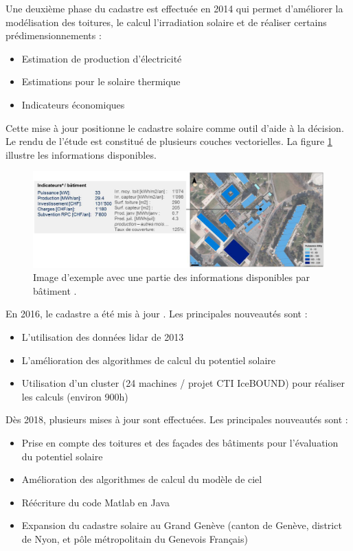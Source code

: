 \par{Une deuxième phase du cadastre est effectuée en 2014 \cite{desthieux_etude_2014} qui permet d'améliorer la modélisation des toitures, le calcul l'irradiation solaire et de réaliser certains prédimensionnements :
\begin{itemize}
    \item Estimation de production d'électricité
    \item Estimations pour le solaire thermique
    \item Indicateurs économiques
\end{itemize}}
\par{Cette mise à jour positionne le cadastre solaire comme outil d'aide à la décision. Le rendu de l'étude est constitué de plusieurs couches vectorielles. La figure \ref{fig:cadastre_solaire_2014} illustre les informations disponibles.}
\begin{figure}[H]
    \centering
    \includegraphics[width=1\linewidth]{02-main//figures/ch2/cadastre_solaire_2014.png}
    \caption{Image d'exemple avec une partie des informations disponibles par bâtiment \cite{desthieux_etude_2014}.}
    \label{fig:cadastre_solaire_2014}
\end{figure}

\par{En 2016, le cadastre a été mis à jour \cite{desthieux_solar_2018}. Les principales nouveautés sont :
\begin{itemize}
    \item L'utilisation des données \gls{lidar} de 2013 \cite{sitg_nuages_2013}
    \item L'amélioration des algorithmes de calcul du potentiel solaire
    \item Utilisation d'un cluster (24 machines / projet CTI IceBOUND) pour réaliser les calculs (environ 900h)
\end{itemize}}

\par{Dès 2018, plusieurs mises à jour \cite{desthieux_solar_2018} sont effectuées. Les principales nouveautés sont :
\begin{itemize}
    \item Prise en compte des toitures et des façades des bâtiments pour l'évaluation du potentiel solaire
    \item Amélioration des algorithmes de calcul du modèle de ciel
    \item Réécriture du code Matlab en Java
    \item Expansion du cadastre solaire au Grand Genève (canton de Genève, district de Nyon, et pôle métropolitain du Genevois Français)
\end{itemize}}

